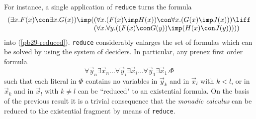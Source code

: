 For instance, a single application of {\tt reduce} turns the formula
\begin{equation}\label{pb29}
\setlength{\arraycolsep}{0cm}
\begin{array}{rl}
(\exists x.F(x) \con \exists x.G(x)) \imp (&( \forall x.(F(x) \imp H(x)) \con \forall x.(G(x) \imp J(x))) \liff \\
&(\forall x.\forall y.((F(x) \con G(y)) \imp (H(x) \con J(y)))))
\end{array}
\end{equation}
into (\ref{pb29-reduced}).
{\tt reduce} considerably enlarges the set of formulas which can be solved
by using the system of deciders.
In particular, any prenex first order formula 
$$
\forall \vec{y}_n \exists \vec{x}_n \ldots
\forall \vec{y}_i \exists \vec{x}_i \ldots
\forall \vec{y}_1 \exists \vec{x}_1 . \Phi
$$
such that each literal in $\Phi$ contains no variables in $\vec{y}_k$ and
in $\vec{x}_l$ with $k < l$, or in $\vec{x}_k$ and in $\vec{x}_l$ with
$k \neq l$ can be ``reduced" to an existential formula.
On the basis of the previous result it is a trivial consequence
that the {\em monadic calculus} can be reduced to the existential fragment
by means of {\tt reduce}.
